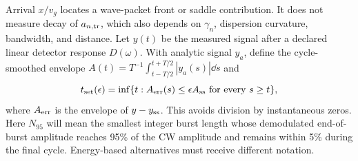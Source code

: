 Arrival $x/v_g$ locates a wave-packet front or saddle contribution. It does not
measure decay of $a_{n,\rm tr}$, which also depends on $\gamma_n$, dispersion
curvature, bandwidth, and distance. Let $y(t)$ be the measured signal after a
declared linear detector response $D(\omega)$. With analytic signal $y_a$, define
the cycle-smoothed envelope $A(t)=T^{-1}\int_{t-T/2}^{t+T/2}|y_a(s)|\dd s$ and
\begin{equation}
 t_{\rm set}(\epsilon)=\inf\{t:A_{\rm err}(s)\le\epsilon A_{\rm ss}
 \text{ for every }s\ge t\},\label{eq:settling}
\end{equation}
where $A_{\rm err}$ is the envelope of $y-y_{\rm ss}$. This avoids division by
instantaneous zeros. Here $N_{95}$ will mean the smallest integer burst length
whose demodulated end-of-burst amplitude reaches 95\% of the CW amplitude and
remains within 5\% during the final cycle. Energy-based alternatives must receive
different notation.
